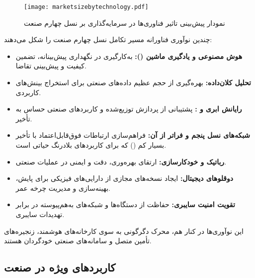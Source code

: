 \vspace{0.5cm}
\begin{figure}[h]
\centering
\texttt{[image: marketsizebytechnology.pdf]}
\caption{نمودار پیش‌بینی تاثیر فناوری‌ها در سرمایه‌گذاری بر نسل چهارم صنعت\cite{GM2025Rise}}
\label{figure:4IR_TechMar}
\end{figure}
\vspace{0.5cm}

چندین نوآوری فناورانه مسیر تکامل نسل چهارم صنعت را شکل می‌دهند\cite{Xu2018Industry4,Tyagi2021Industry4}:

\begin{itemize}
\item
\textbf{هوش مصنوعی و یادگیری ماشین ():} به‌کارگیری در نگهداری پیش‌بینانه، تضمین کیفیت و پیش‌بینی تقاضا.

\item
\textbf{تحلیل کلان‌داده:} بهره‌گیری از حجم عظیم داده‌های صنعتی برای استخراج بینش‌های کاربردی.

\item
\textbf{رایانش ابری و :} پشتیبانی از پردازش توزیع‌شده و کاربردهای صنعتی حساس به تأخیر.

\item
\textbf{شبکه‌‌های نسل پنجم و فراتر از آن:} فراهم‌سازی ارتباطات فوق‌قابل‌اعتماد با تأخیر بسیار کم () که برای کاربردهای بلادرنگ حیاتی است.

\item
\textbf{رباتیک و خودکارسازی:} ارتقای بهره‌وری، دقت و ایمنی در عملیات صنعتی.

\item
\textbf{دوقلوهای دیجیتال:} ایجاد نسخه‌های مجازی از دارایی‌های فیزیکی برای پایش، بهینه‌سازی و مدیریت چرخه عمر.

\item
\textbf{تقویت امنیت سایبری:} حفاظت از دستگاه‌ها و شبکه‌های به‌هم‌پیوسته در برابر تهدیدات سایبری.
\end{itemize}

این نوآوری‌ها در کنار هم، محرک دگرگونی به سوی کارخانه‌های هوشمند، زنجیره‌های تأمین متصل و سامانه‌های صنعتی خودگردان هستند.

\subsection{کاربردهای ویژه در صنعت}

